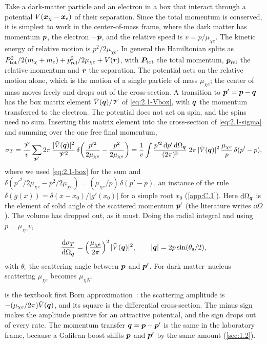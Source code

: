 Take a dark-matter particle and an electron in a box that interact through a potential $V(\bm{x}_\chi - \bm{x}_e)$ of their separation. Since the total momentum is conserved, it is simplest to work in the center-of-mass frame, where the dark matter has momentum $\bm{p}$, the electron $-\bm{p}$, and the relative speed is $v = p/\mu_{\chi e}$. The kinetic energy of relative motion is $p^2/2\mu_{\chi e}$. In general the Hamiltonian splits as $P_{\mathrm{tot}}^2/2(m_\chi + m_e) + p_{\mathrm{rel}}^2/2\mu_{\chi e} + V(\bm{r})$, with $\bm{P}_{\mathrm{tot}}$ the total momentum, $\bm{p}_{\mathrm{rel}}$ the relative momentum and $\bm{r}$ the separation. The potential acts on the relative motion alone, which is the motion of a single particle of mass $\mu_{\chi e}$; the center of mass moves freely and drops out of the cross-section. A transition to $\bm{p}' = \bm{p} - \bm{q}$ has the box matrix element $\tilde V(\bm{q})/\mathscr{V}$ of \cref{eq:2.1-Vbox}, with $\bm{q}$ the momentum transferred to the electron. The potential does not act on spin, and the spins need no sum. Inserting this matrix element into the cross-section of \cref{eq:2.1-sigma} and summing over the one free final momentum,
\begin{equation*}
  \sigma_T = \frac{\mathscr{V}}{v}\sum_{\bm{p}'}2\pi\,\frac{|\tilde V(\bm{q})|^2}{\mathscr{V}^2}\,\delta\!\left(\frac{p'^2}{2\mu_{\chi e}} - \frac{p^2}{2\mu_{\chi e}}\right)
  = \frac{1}{v}\int\frac{p'^2\,\mathrm{d} p'\,\mathrm{d}\Omega_{\bm{q}}}{(2\pi)^3}\;2\pi\,|\tilde V(\bm{q})|^2\,\frac{\mu_{\chi e}}{p}\,\delta(p' - p),
\end{equation*}
where we used \cref{eq:2.1-box} for the sum and $\delta(p'^2/2\mu_{\chi e} - p^2/2\mu_{\chi e}) = (\mu_{\chi e}/p)\,\delta(p' - p)$, an instance of the rule $\delta(g(x)) = \delta(x - x_0)/|g'(x_0)|$ for a simple root $x_0$ (\cref{app:C.1}). Here $\mathrm{d}\Omega_{\bm{q}}$ is the element of solid angle of the scattered momentum $\bm{p}'$ (the literature writes $\dd\Omega$). The volume has dropped out, as it must. Doing the radial integral and using $p = \mu_{\chi e}v$,
\begin{keyresult}
\begin{equation}
  \frac{\mathrm{d}\sigma_T}{\mathrm{d}\Omega_{\bm{q}}} = \left(\frac{\mu_{\chi e}}{2\pi}\right)^2|\tilde V(\bm{q})|^2 ,
  \qquad |\bm{q}| = 2p\sin(\theta_{\mathrm{s}}/2),
  \label{eq:2.2-born}
\end{equation}
with $\theta_{\mathrm{s}}$ the scattering angle between $\bm{p}$ and $\bm{p}'$. For dark-matter--nucleus scattering $\mu_{\chi e}$ becomes $\mu_{\chi N}$.
\end{keyresult}
 is the textbook first Born approximation~\cite[Chap.~6]{sakurai2017modern}: the scattering amplitude is $-(\mu_{\chi e}/2\pi)\tilde V(\bm{q})$, and its square is the differential cross-section. The minus sign makes the amplitude positive for an attractive potential, and the sign drops out of every rate. The momentum transfer $\bm{q} = \bm{p} - \bm{p}'$ is the same in the laboratory frame, because a Galilean boost shifts $\bm{p}$ and $\bm{p}'$ by the same amount (\cref{sec:1.2}).

